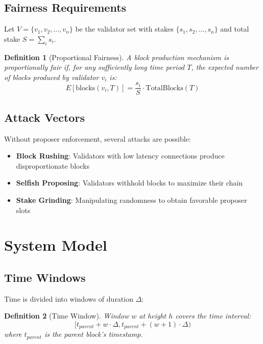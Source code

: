 \documentclass[11pt,letterpaper]{article}
\newtheorem{definition}{Definition}
\begin{document}
\subsection{Fairness Requirements}

Let $V = \{v_1, v_2, \ldots, v_n\}$ be the validator set with stakes $\{s_1, s_2, \ldots, s_n\}$ and total stake $S = \sum_i s_i$.

\begin{definition}[Proportional Fairness]
A block production mechanism is proportionally fair if, for any sufficiently long time period $T$, the expected number of blocks produced by validator $v_i$ is:
\begin{equation}
E[\text{blocks}(v_i, T)] = \frac{s_i}{S} \cdot \text{TotalBlocks}(T)
\end{equation}
\end{definition}

\subsection{Attack Vectors}

Without proposer enforcement, several attacks are possible:

\begin{itemize}
    \item \textbf{Block Rushing}: Validators with low latency connections produce disproportionate blocks
    \item \textbf{Selfish Proposing}: Validators withhold blocks to maximize their chain
    \item \textbf{Stake Grinding}: Manipulating randomness to obtain favorable proposer slots
\end{itemize}

\section{System Model}

\subsection{Time Windows}

Time is divided into windows of duration $\Delta$:

\begin{definition}[Time Window]
Window $w$ at height $h$ covers the time interval:
\begin{equation}
[t_{parent} + w \cdot \Delta, t_{parent} + (w+1) \cdot \Delta)
\end{equation}
where $t_{parent}$ is the parent block's timestamp.
\end{definition}
\end{document}
